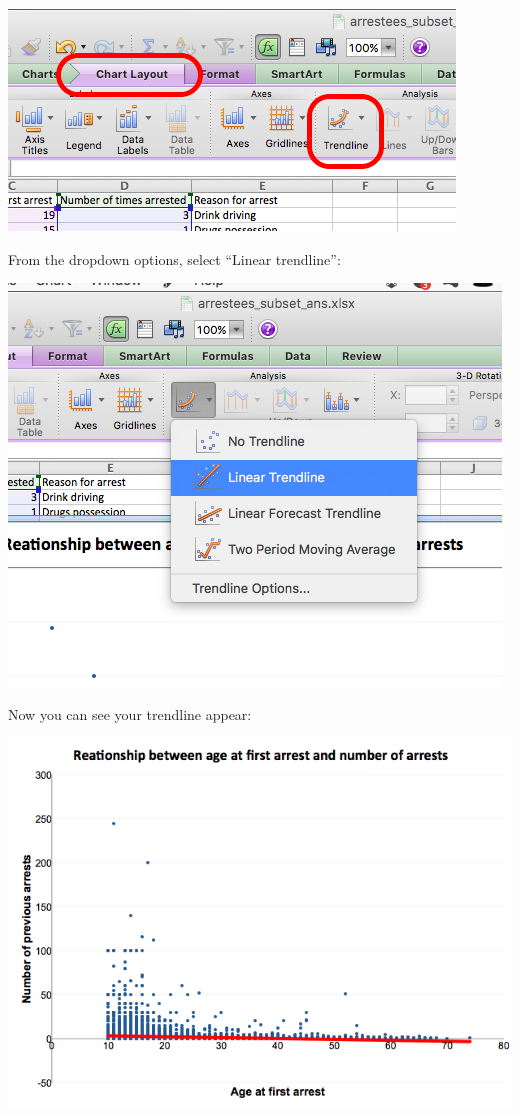 \documentclass[]{book}
\theoremstyle{definition}
\theoremstyle{definition}
\theoremstyle{definition}
\theoremstyle{remark}
\begin{document}
\includegraphics{imgs/scatter_10.png}

From the dropdown options, select ``Linear trendline'':

\includegraphics{imgs/scatter_11.png}

Now you can see your trendline appear:

\includegraphics{imgs/scatter_12.png}
\end{document}
